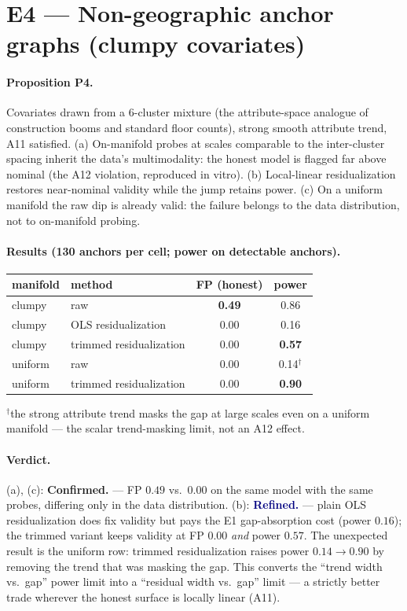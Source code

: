 \documentclass[11pt]{article}
\newcommand{\confirmed}{\textcolor{ok}{\textbf{Confirmed.}}}
\newcommand{\refined}{\textcolor{navy}{\textbf{Refined.}}}
\begin{document}
\section{E4 --- Non-geographic anchor graphs (clumpy covariates)}

\paragraph{Proposition P4.} Covariates drawn from a 6-cluster mixture (the
attribute-space analogue of construction booms and standard floor counts), strong smooth
attribute trend, A11 satisfied. (a) On-manifold probes at scales comparable to the
inter-cluster spacing inherit the data's multimodality: the honest model is flagged far
above nominal (the A12 violation, reproduced in vitro). (b) Local-linear residualization
restores near-nominal validity while the jump retains power. (c) On a uniform manifold the
raw dip is already valid: the failure belongs to the data distribution, not to on-manifold
probing.

\paragraph{Results (130 anchors per cell; power on detectable anchors).}
\begin{center}\small
\begin{tabular}{llcc}
\toprule
manifold & method & FP (honest) & power\\
\midrule
clumpy  & raw                 & \textbf{0.49} & 0.86\\
clumpy  & OLS residualization & 0.00 & 0.16\\
clumpy  & trimmed residualization & 0.00 & \textbf{0.57}\\
uniform & raw                 & 0.00 & 0.14$^\dagger$\\
uniform & trimmed residualization & 0.00 & \textbf{0.90}\\
\bottomrule
\end{tabular}
\end{center}
{\small $^\dagger$the strong attribute trend masks the gap at large scales even on a
uniform manifold --- the scalar trend-masking limit, not an A12 effect.}

\paragraph{Verdict.} (a), (c): \confirmed{} --- FP $0.49$ vs.\ $0.00$ on the same model
with the same probes, differing only in the data distribution. (b): \refined{} --- plain
OLS residualization does fix validity but pays the E1 gap-absorption cost (power $0.16$);
the trimmed variant keeps validity at FP $0.00$ \emph{and} power $0.57$. The unexpected
result is the uniform row: trimmed residualization raises power $0.14\to 0.90$ by removing
the trend that was masking the gap. This converts the ``trend width vs.\ gap'' power limit
into a ``residual width vs.\ gap'' limit --- a strictly better trade wherever the honest
surface is locally linear (A11).
\end{document}
